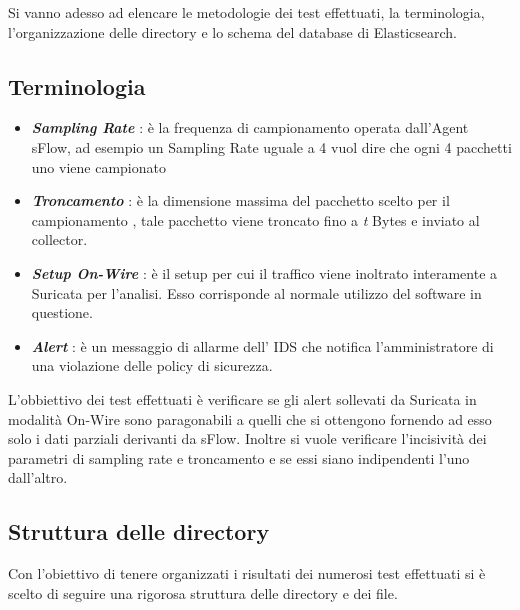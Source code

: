 \documentclass[12pt,a4paper,openright,twoside]{report}
\begin{document}
Si vanno adesso ad elencare le metodologie dei test effettuati, la terminologia, l'organizzazione delle
directory e lo schema del database di Elasticsearch.

\subsection{Terminologia}

\begin{itemize}
  \item {\it \bf Sampling Rate} : \`e la frequenza di campionamento operata dall'Agent sFlow,
  ad esempio un Sampling Rate uguale a 4 vuol dire che ogni 4 pacchetti uno viene
  campionato
  \item {\it \bf Troncamento} : \`e la dimensione massima del pacchetto scelto per il campionamento
  , tale pacchetto viene troncato fino a {\it t} Bytes e inviato al collector.
  \item {\it \bf Setup On-Wire} : \`e il setup per cui il traffico viene inoltrato interamente
  a Suricata per l'analisi. Esso corrisponde al normale utilizzo del software in questione.
  \item {\it \bf Alert} : \`e un messaggio di allarme dell' IDS che notifica l'amministratore
  di una violazione delle policy di sicurezza.
\end{itemize}


L'obbiettivo dei test effettuati  \`e verificare se gli alert sollevati da Suricata
in modalit\`a On-Wire sono paragonabili a quelli che si ottengono fornendo ad esso solo
i dati parziali derivanti da sFlow.
Inoltre si vuole verificare l'incisivit\`a dei parametri di sampling rate e troncamento e
se essi siano indipendenti l'uno dall'altro.

\subsection{Struttura delle directory}

Con l'obiettivo di tenere organizzati i risultati dei numerosi test effettuati si
\`e scelto di seguire una rigorosa struttura delle directory e dei file.
\end{document}
